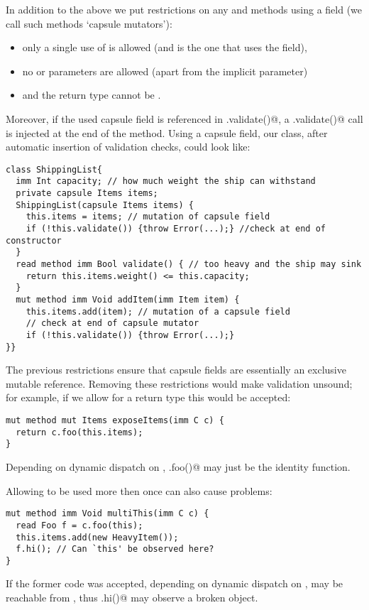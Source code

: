 In addition to the above we put restrictions on any \Q@mut@ and \Q@capsule@ methods using a \Q@capsule@ field (we call such methods `capsule mutators'):
\begin{itemize}
\item only a single use of \Q@this@ is allowed (and is the one that uses the field),
\item no \Q@mut@ or \Q@read@ parameters are allowed (apart from the implicit \Q@this@ parameter)
\item and the return type cannot be \Q@mut@.
\end{itemize}
\noindent  Moreover, if the used capsule field is referenced in \Q@.validate()@, a \Q@this.validate()@ call is injected at the end of the method.
Using a capsule field, our \Q@ShippingList@ class, after automatic insertion of validation checks, could look like:
\saveSpace
\begin{lstlisting}
class ShippingList{
  imm Int capacity; // how much weight the ship can withstand
  private capsule Items items;
  ShippingList(capsule Items items) {
    this.items = items; // mutation of capsule field
    if (!this.validate()) {throw Error(...);} //check at end of constructor
  }
  read method imm Bool validate() {	// too heavy and the ship may sink
    return this.items.weight() <= this.capacity;
  }
  mut method imm Void addItem(imm Item item) {
    this.items.add(item); // mutation of a capsule field
    // check at end of capsule mutator
    if (!this.validate()) {throw Error(...);}
}}
\end{lstlisting}
\saveSpace

\noindent The previous restrictions ensure that capsule fields are essentially an exclusive mutable reference.
Removing these restrictions would make validation unsound; for example, if we allow for a \Q@mut@ return type this would be accepted:

\saveSpace
\begin{lstlisting}
mut method mut Items exposeItems(imm C c) {
  return c.foo(this.items);
}
\end{lstlisting}
\saveSpace
\noindent Depending on dynamic dispatch on \Q@c@, \Q@c.foo()@ may just be the identity function.

Allowing \Q@this@ to be used more then once can also cause problems:
\saveSpace
\begin{lstlisting}
mut method imm Void multiThis(imm C c) {
  read Foo f = c.foo(this);
  this.items.add(new HeavyItem());
  f.hi(); // Can `this' be observed here?
}
\end{lstlisting}
\saveSpace
\noindent If the former code was accepted, depending on dynamic dispatch on \Q@c@,
\Q@this@ may be reachable from \Q@f@, thus \Q@f.hi()@ may observe a broken object.

